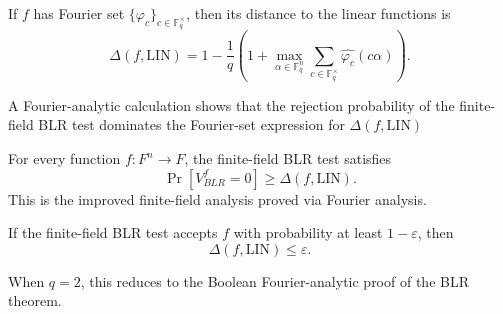 \begin{lemma}
    \label{lem:ff-distance-to-linearity}
    If $f$ has Fourier set $\{\varphi_c\}_{c \in \mathbb{F}_q^\times}$,
  then its distance to the linear functions is
  \[
    \Delta(f,\mathrm{LIN})
    = 1 - \frac{1}{q}\left(1 + \max_{\alpha \in \mathbb{F}_q^n}
      \sum_{c \in \mathbb{F}_q^\times} \widehat{\varphi_c}(c\alpha)\right).
  \]
\end{lemma}

\begin{lemma}
    \label{lem:ff-spectral-bound}
A Fourier-analytic calculation shows that the rejection probability
  of the finite-field BLR test dominates the Fourier-set expression for
  $\Delta(f,\mathrm{LIN})$
\end{lemma}

\begin{lemma}
    \label{thm:ff-blr-improved-analysis}
For every function $f : F^n \to F$, the finite-field BLR test
  satisfies
  \[
    \Pr[V_{BLR}^f = 0] \ge \Delta(f,\mathrm{LIN}).
  \]
  This is the improved finite-field analysis proved via Fourier analysis.
\end{lemma}

\begin{lemma}
    \label{cor:ff-high-acceptance-close-to-linear}
If the finite-field BLR test accepts $f$ with probability at least
  $1 - \varepsilon$, then
  \[
    \Delta(f,\mathrm{LIN}) \le \varepsilon.
  \]
\end{lemma}

\begin{lemma}
    \label{rem:q2-special-case}
    When $q = 2$, this reduces to the Boolean Fourier-analytic proof
  of the BLR theorem.
\end{lemma}
